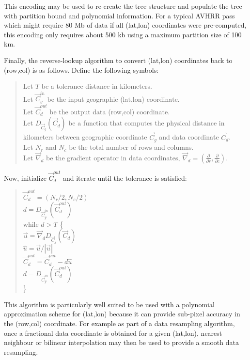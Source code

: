 This encoding may be used to re-create the tree structure and populate
the tree with partition bound and polynomial information. For a
typical AVHRR pass which might require 80 Mb of data if all (lat,lon)
coordinates were pre-computed, this encoding only requires about 500
kb using a maximum partition size of 100 km.

Finally, the reverse-lookup algorithm to convert (lat,lon) coordinates
back to (row,col) is as follows.  Define the following symbols:
\begin{quote}
  Let $T$ be a tolerance distance in kilometers. \\
  Let $\overrightarrow{C}_g^{in}$ be the input geographic (lat,lon) 
    coordinate. \\ 
  Let $\overrightarrow{C}_d^{out}$ be the output data (row,col) coordinate. \\
  Let $D_{\overrightarrow{C}_g}(\overrightarrow{C}_d)$ be a function that
    computes the physical distance in kilometers between geographic 
    coordinate $\overrightarrow{C}_g$ and data coordinate 
    $\overrightarrow{C}_d$. \\
  Let $N_r$ and $N_c$ be the total number of rows and columns. \\
  Let $\overrightarrow{\nabla}_d$ be the gradient operator in data 
    coordinates, $\overrightarrow{\nabla}_d = (\frac{\partial}{\partial r}, 
    \frac{\partial}{\partial c})$. \\
\end{quote}
Now, initialize $\overrightarrow{C}_d^{out}$ and iterate until the
tolerance is satisfied:
\begin{quote}
  $\overrightarrow{C}_d^{out} = (N_r/2, N_c/2)$ \\
  $d = D_{\overrightarrow{C}_g^{in}}(\overrightarrow{C}_d^{out})$ \\
  while $d > T$ \{ \\
    \hspace*{0.5cm} $\overrightarrow{u} = \overrightarrow{\nabla}_d
      D_{\overrightarrow{C}_g}(\overrightarrow{C}_d)$ \\
    \hspace*{0.5cm} $\hat{u} = \overrightarrow{u} / |\overrightarrow{u}|$ \\
    \hspace*{0.5cm} $\overrightarrow{C}_d^{out} = \overrightarrow{C}_d^{out}
      - d \hat{u}$ \\
    \hspace*{0.5cm} $d = D_{\overrightarrow{C}_g^{in}}(\overrightarrow{C}_d^{out})$ \\
  \} 
\end{quote}
This algorithm is particularly well suited to be used with a
polynomial approximation scheme for (lat,lon) because it can provide
sub-pixel accuracy in the (row,col) coordinate. For example as part of
a data resampling algorithm, once a fractional data coordinate is
obtained for a given (lat,lon), nearest neighbour or bilinear
interpolation may then be used to provide a smooth data resampling.

